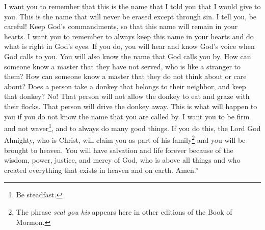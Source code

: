\bverse \iffalse And I would that ye should remember also, that this is the name that I said I should give unto you that never should be blotted out, except it be through transgression; therefore, take heed that ye do not transgress, that the name be not blotted out of your hearts. \fi
I want you to remember that this is the name that I told you that I would give to you. This is the name that will never be erased except through sin. I tell you, be careful! Keep God's commandments, so that this name will remain in your hearts.
\bverse \iffalse I say unto you, I would that ye should remember to retain the name written always in your hearts, that ye are not found on the left hand of God, but that ye hear and know the voice by which ye shall be called, and also, the name by which he shall call you. \fi
I want you to remember to always keep this name in your hearts and do what is right in God's eyes. If you do, you will hear and know God's voice when God calls to you. You will also know the name that God calls you by.
\bverse \iffalse For how knoweth a man the master whom he has not served, and who is a stranger unto him, and is far from the thoughts and intents of his heart? \fi
How can someone know a master that they have not served, who is like a stranger to them? How can someone know a master that they do not think about or care about?
\bverse \iffalse And again, doth a man take an ass which belongeth to his neighbor, and keep him? I say unto you, Nay; he will not even suffer that he shall feed among his flocks, but will drive him away, and cast him out. I say unto you, that even so shall it be among you if ye know not the name by which ye are called. \fi
Does a person take a donkey that belongs to their neighbor, and keep that donkey? No! That person will not allow the donkey to eat and graze with their flocks. That person will drive the donkey away. This is what will happen to you if you do not know the name that you are called by.
\bverse \iffalse Therefore, I would that ye should be steadfast and immovable, always abounding in good works, that Christ, the Lord God Omnipotent, may seal you his, that you may be brought to heaven, that ye may have everlasting salvation and eternal life, through the wisdom, and power, and justice, and mercy of him who created all things, in heaven and in earth, who is God above all. Amen. \fi
I want you to be firm and not waver\footnote{Be steadfast.}, and to always do many good things. If you do this, the Lord God Almighty, who is Christ, will claim you as part of his family\footnote{The phrase \textit{seal you his} appears here in other editions of the Book of Mormon.} and you will be brought to heaven. You will have salvation and life forever because of the wisdom, power, justice, and mercy of God, who is above all things and who created everything that exists in heaven and on earth. Amen.''

